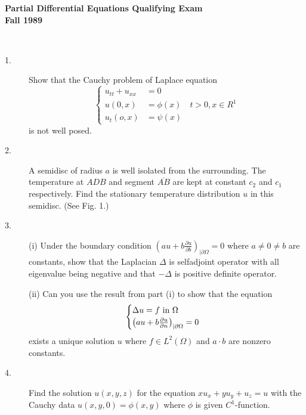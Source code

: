 \documentclass{article}
\begin{document}






\begin{center}\begin{LARGE}
{\bf Partial Differential Equations Qualifying Exam}\\ 
{\bf Fall 1989}\\ \end{LARGE}
\end{center}
\vspace{0.1in}
\noindent\hrulefill\\

\begin{description}
\item[1.]
Show that the Cauchy problem of Laplace equation
$$\begin{cases}
        u_{tt} + u_{xx} &= 0 \\
        u(0,x) &= \phi(x) \quad t > 0, x \in R^1 \\
        u_t (o,x) &= \psi (x)
        \end{cases}$$
is not well posed.

\item[2.]
A semidisc of radius $a$ is well isolated from the surrounding. The temperature
at $ADB$ and segment $\overline{AB}$ are kept at constant $c_2$ and $c_1$
respectively. Find the stationary temperature distribution $u$ in this
semidisc. (See Fig. 1.)

\item[3.] (i)
Under the boundary condition
$\left(au + b \frac{\partial u}{\partial b}\right)_{|\partial \Omega}=0$
where $a \neq 0 \neq b$ are constants, show that the Laplacian $\Delta$
is selfadjoint operator with all eigenvalue being negative and that
$-\Delta$ is positive definite operator.

\item[\quad] (ii)
Can you use the result from part (i) to show that the equation
$$\begin{cases}
        \Delta u  =f \hbox{\ in\ } \Omega \\
        \left(au + b\frac{\partial u}{\partial n} \right)_{|\partial \Omega}
        = 0
        \end{cases}$$
exists a unique solution $u$ where $f \in L^2(\Omega)$ and $a \cdot b$
are nonzero constants.

\item[4.]
Find the solution $u(x,y,z)$ for the equation $xu_x+yu_y + u_z =u$ with the
Cauchy data $u(x,y,0) = \phi(x,y)$ where $\phi$ is given $C^1$-function.


\end{description}
\end{document}
